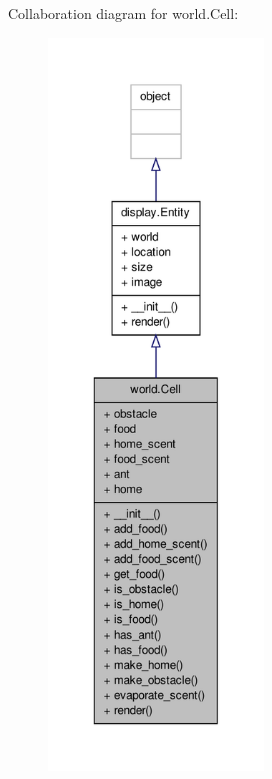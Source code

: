 Collaboration diagram for world.\+Cell\+:\nopagebreak
\begin{figure}[H]
\begin{center}
\leavevmode
\includegraphics[height=550pt]{classworld_1_1Cell__coll__graph}
\end{center}
\end{figure}
